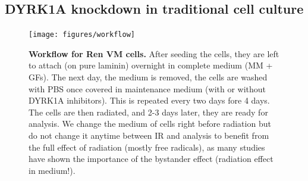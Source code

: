 \documentclass[onecolumn,10pt]{asme2ej}
\begin{document}
\subsection{DYRK1A knockdown in traditional cell culture}
\begin{figure}[h]
	\texttt{[image: figures/workflow]}
	\caption{\textbf{Workflow for Ren VM cells.} After seeding the cells, they are left to attach (on pure laminin) overnight in complete medium (MM + GFs). The next day, the medium is removed, the cells are washed with PBS once covered in maintenance medium (with or without DYRK1A inhibitors). This is repeated every two days fore 4 days. The cells are then radiated, and 2-3 days later, they are ready for analysis. We change the medium of cells right before radiation but do not change it anytime between IR and analysis to benefit from the full effect of radiation (mostly free radicals), as many studies have shown the importance of the bystander effect (radiation effect in medium!).}
	\label{workflow}
\end{figure}
\end{document}
